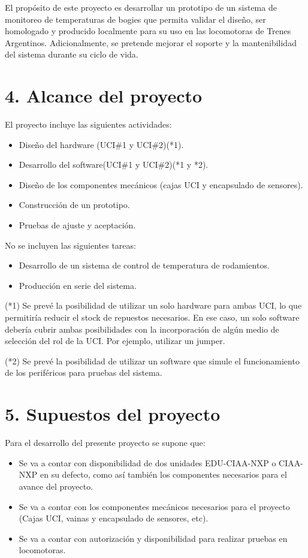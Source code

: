 \documentclass[
11pt, %
codirector, %
]{charter}
\begin{document}
El propósito de este proyecto es desarrollar un prototipo de un sistema de monitoreo de temperaturas de bogies que permita validar el diseño, ser homologado y producido localmente para su uso en las locomotoras de Trenes Argentinos. Adicionalmente, se pretende mejorar el soporte y la mantenibilidad del sistema durante su ciclo de vida.


\section{4. Alcance del proyecto}
\label{sec:alcance}

El proyecto incluye las siguientes actividades:
\begin{itemize}
\item Diseño del hardware (UCI\#1 y UCI\#2)(*1).
\item Desarrollo del software(UCI\#1 y UCI\#2)(*1 y *2).
\item Diseño de los componentes mecánicos (cajas UCI y encapsulado de sensores).
\item Construcción de un prototipo.
\item Pruebas de ajuste y aceptación.
\end{itemize}
No se incluyen las siguientes tareas: 
\begin{itemize}
\item Desarrollo de un sistema de control de temperatura de rodamientos.
\item Producción en serie del sistema.
\end{itemize}
(*1) Se prevé la posibilidad de utilizar un solo hardware para ambas UCI, lo que permitiría reducir el stock de repuestos necesarios. En ese caso, un solo software debería cubrir ambas posibilidades con la incorporación de algún medio de selección del rol de la UCI. Por ejemplo, utilizar un jumper.

(*2) Se prevé la posibilidad de utilizar un software que simule el funcionamiento de los periféricos para pruebas del sistema.

\section{5. Supuestos del proyecto}
\label{sec:supuestos}

Para el desarrollo del presente proyecto se supone que:

\begin{itemize}
	\item Se va a contar con disponibilidad de dos unidades EDU-CIAA-NXP o CIAA-NXP en su defecto, como así también los componentes necesarios para el avance del proyecto.
	\item Se va a contar con los componentes mecánicos necesarios para el proyecto (Cajas UCI, vainas y encapsulado de sensores, etc). 
	\item Se va a contar con autorización y disponibilidad para realizar pruebas en locomotoras.
\end{itemize}
\end{document}
